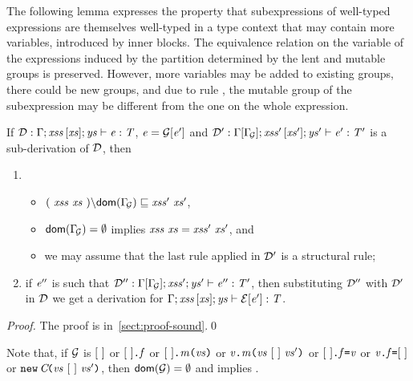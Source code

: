 {The following lemma expresses the property that  subexpressions of well-typed expressions are themselves
well-typed in a type context that may contain more variables, introduced by inner blocks.
The equivalence relation on the variable of the expressions
induced by the partition determined by the lent and mutable groups is preserved.
However, more  variables may be added to existing groups, there
could be new groups, and due to rule , 
the mutable group of the  subexpression may be different from the
one on the whole expression.
\begin{lemma}[Context]\label{lemma:subCtx}
If ${\cal D}:\Gamma;\mathit{xss}\,[\mathit{xs}];\mathit{ys}\vdash {\mathit{e}}:\mathit{T}$, $\mathit{e}={\cal{G}}[\mathit{e}']$ and
${\cal D}':\Gamma[\Gamma_{\!{\cal{G}}}];\mathit{xss}'\,[\mathit{xs}'];\mathit{ys}'\vdash {\mathit{e}'}:\mathit{T}'$ is a sub-derivation of ${\cal D}$, 
then
\begin{enumerate}  
\item 
\begin{itemize}
\item $\LessEq{(\ \LentLocked\ \xs\ ){\setminus}\dom{\TypeEnv{\genCtx}}}{\LentLocked'\ \xs'}$, 
\item $\textsf{dom}(\Gamma_{\!{\cal{G}}})=\emptyset$ implies 
$\mathit{xss}\ \mathit{xs}=\mathit{xss}'\ \mathit{xs}'$, and
\item
we may assume that the last rule applied in ${\cal D}'$ is a structural rule;
\end{itemize}
  \item if $\mathit{e}''$ is such that ${\cal D}'':\Gamma[\Gamma_{\!{\cal{G}}}];\mathit{xss}';\mathit{ys}'\vdash {\mathit{e}''}:\mathit{T}'$, then substituting ${\cal D}''$ with ${\cal D}'$ in ${\cal D}$ we get a derivation for $\Gamma;\mathit{xss}\,[\mathit{xs}];\mathit{ys}\vdash {\cal{E}}[\mathit{e}']:\mathit{T}$.
\end{enumerate}
\end{lemma}
\begin{proof}
The proof is in~\ref{sect:proof-sound}.\qed
\end{proof}
Note that, if ${\cal{G}}$ is $[\ ]$ or $[\ ]\texttt{.}\mathit{f}$ or $[\ ]\texttt{.}\mathit{m}\texttt{(}\mathit{vs}\texttt{)}$ or 
$\mathit{v}\texttt{.}\mathit{m}\texttt{(}\mathit{vs}\ [\ ]\ \mathit{vs}'\texttt{)}$ or $[\ ]\texttt{.}\mathit{f}\texttt{=}\mathit{v}$ or 
$\mathit{v}\texttt{.}\mathit{f}\texttt{=}[\ ]$ or $\ConstrCall{\C}{\vs\ \emptyctx\ \vs'}$, then  $ \textsf{dom}({\cal{G}})=\emptyset$ and 
 implies . 

}

